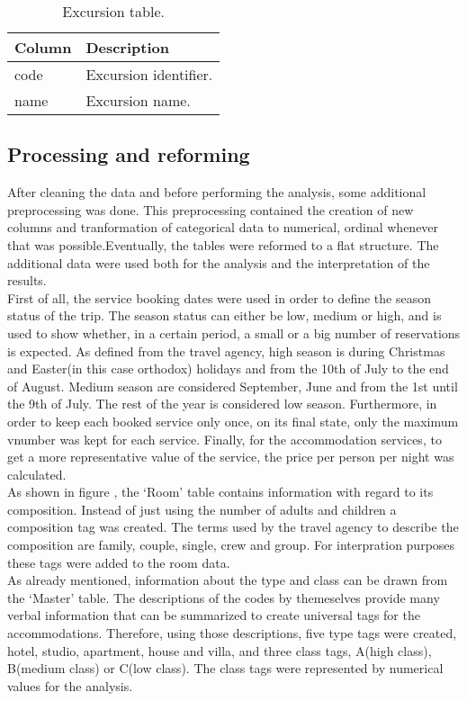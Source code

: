 \begin{table}[!htb]
\begin{center}
\begin{tabular}{l | p{12cm}}
\textcolor{theme}{\textbf{Column}} & \textcolor{theme}{\textbf{Description}}\\
\hline
code & Excursion identifier.\\
\hline
name & Excursion name.\\
\hline
\end{tabular}
\caption{Excursion table.}
\label{tab:excursion}
\end{center}
\end{table}
\subsection{Processing and reforming}
After cleaning the data and before performing the analysis, some additional preprocessing was done. This preprocessing contained the creation of new columns and tranformation of categorical data to numerical, ordinal whenever that was possible.Eventually, the tables were reformed to a flat structure. The additional data were used both for the analysis and the interpretation of the results. \\
First of all, the service booking dates were used in order to define the season status of the trip. The season status can either be low, medium or high, and is used to show whether, in a certain period, a small or a big number of reservations is expected. As defined from the travel agency, high season is during Christmas and Easter(in this case orthodox) holidays and from the 10th of July to the end of August. Medium season are considered September, June and from the 1st until the 9th of July. The rest of the year is considered low season. Furthermore, in order to keep each booked service only once, on its final state, only the maximum vnumber was kept for each service. Finally, for the accommodation services, to get a more representative value of the service, the price per person per night was calculated. \\
As shown in figure , the `Room' table contains information with regard to its composition. Instead of just using the number of adults and children a composition tag was created. The terms used by the travel agency to describe the composition are family, couple, single, crew and group. For interpration purposes these tags were added to the room data. \\
As already mentioned, information about the type and class can be drawn from the `Master' table. The descriptions of the codes by themeselves provide many verbal information that can be summarized to create universal tags for the accommodations. Therefore, using those descriptions, five type tags were created, hotel, studio, apartment, house and villa, and three class tags, A(high class), B(medium class) or C(low class). The class tags were represented by numerical values for the analysis.
